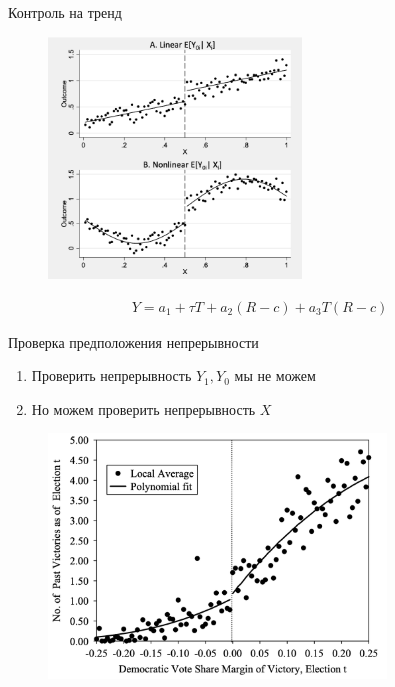 \begin{frame}{Контроль на тренд}

\begin{figure}
        \centering
        \includegraphics[width=0.6\textwidth]{Lecture_Sources/Images/rdd_trend_control.png}
    \end{figure}

\begin{gather*}
    Y = a_1 + \tau T + a_2 (R - c) + a_3 T (R - c)
\end{gather*}
    
\end{frame}

\begin{frame}{Проверка предположения непрерывности}
    \begin{enumerate}
        \item Проверить непрерывность $Y_1, Y_0$ мы не можем
        \item Но можем проверить непрерывность $X$
    \end{enumerate}
    \begin{figure}
        \centering
        \includegraphics[width=0.8\textwidth]{Images/rdd_placebo.png}
    \end{figure}
\end{frame}



